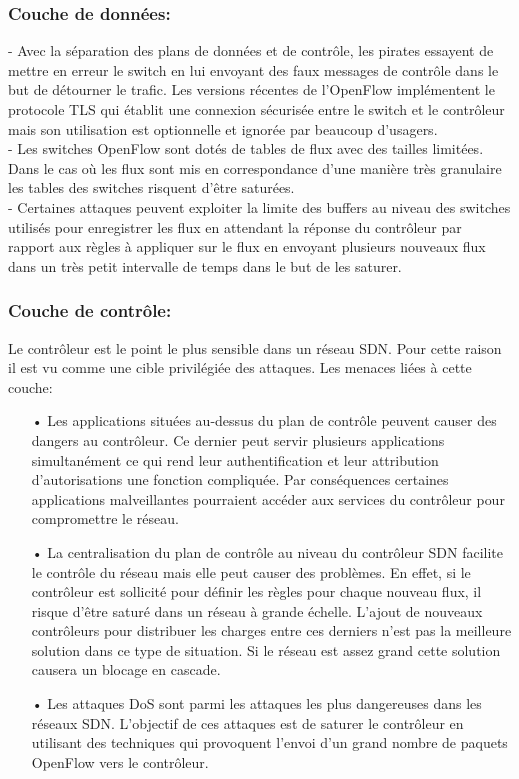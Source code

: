 \subsubsection{Couche de données:}
- Avec la séparation des plans de données et de contrôle, les pirates essayent de mettre en erreur le switch en lui envoyant des faux messages de contrôle dans le but de détourner le trafic. Les versions récentes de l’OpenFlow implémentent le protocole TLS qui établit une connexion sécurisée entre le switch et le contrôleur mais son utilisation est optionnelle et ignorée par beaucoup d’usagers.\\

- Les switches OpenFlow sont dotés de tables de flux avec des tailles limitées. Dans le cas où les flux sont mis en correspondance d’une manière très granulaire les tables des switches risquent d’être saturées.\\

- Certaines attaques peuvent exploiter la limite des buffers au niveau des switches utilisés pour enregistrer les flux en attendant la réponse du contrôleur par rapport aux règles à appliquer sur le flux  en envoyant plusieurs nouveaux flux dans un très petit intervalle de temps dans le but de les saturer.

\subsubsection{Couche de contrôle:} 
Le contrôleur est le point le plus sensible dans un réseau SDN. Pour cette raison il est vu comme une cible privilégiée des attaques. Les menaces liées à cette couche:\\
\begin{itemize}
\item[•]Les applications situées au-dessus du plan de contrôle peuvent causer des dangers au contrôleur. Ce dernier peut servir plusieurs applications simultanément ce qui rend leur authentification et leur attribution d’autorisations une fonction compliquée. Par conséquences certaines applications malveillantes pourraient accéder aux services du contrôleur pour compromettre le réseau.\\
\item[•]La centralisation du plan de contrôle au niveau du contrôleur SDN facilite le contrôle du réseau mais elle peut causer des problèmes. En effet, si le contrôleur est sollicité pour définir les règles pour chaque nouveau flux, il risque d’être saturé dans un réseau à grande échelle. L’ajout de nouveaux contrôleurs pour distribuer les charges entre ces derniers n’est pas la meilleure solution dans ce type de situation. Si le réseau est assez grand cette solution causera un blocage en cascade.\\
\item[•]Les attaques DoS sont parmi les attaques les plus dangereuses dans les réseaux SDN. L’objectif de ces attaques est de saturer le contrôleur en utilisant des techniques qui provoquent l’envoi d’un grand nombre de paquets OpenFlow vers le contrôleur. 
\end{itemize}

